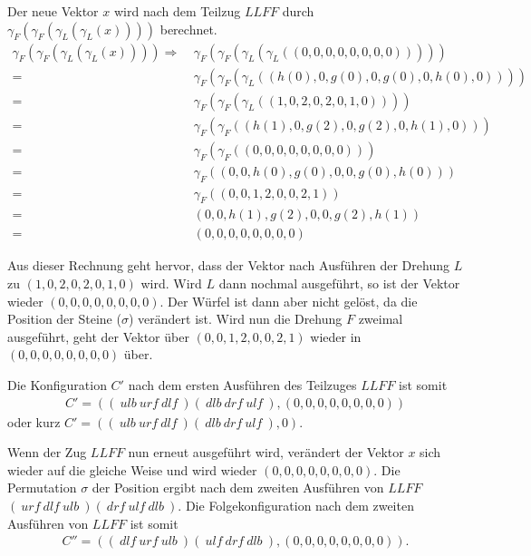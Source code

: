 \documentclass[12pt,a4paper, usenames, dvipsnames]{article}
\theoremstyle{mystyle}
\theoremstyle{definition}
\begin{document}
Der neue Vektor $x$ wird nach dem Teilzug $LLFF$ durch $\gamma_F(\gamma_F(\gamma_L(\gamma_L(x))))$ berechnet. 
\begin{align*}
 \gamma_F(\gamma_F(\gamma_L(\gamma_L(x)))) \Rightarrow \ & \gamma_F(\gamma_F(\gamma_L(\gamma_L((0,0,0,0,0,0,0,0))))) \\
= \ & \gamma_F(\gamma_F(\gamma_L((h(0),0,g(0),0,g(0),0,h(0),0)))) \\
= \ & \gamma_F(\gamma_F(\gamma_L((1,0,2,0,2,0,1,0)))) \\
= \ & \gamma_F(\gamma_F((h(1),0,g(2),0,g(2),0,h(1),0))) \\
= \ & \gamma_F(\gamma_F((0,0,0,0,0,0,0,0))) \\
= \ & \gamma_F((0,0,h(0),g(0),0,0,g(0),h(0))) \\
= \ & \gamma_F((0,0,1,2,0,0,2,1)) \\
= \ & (0,0,h(1),g(2),0,0,g(2),h(1)) \\
= \ & (0,0,0,0,0,0,0,0)
\end{align*}

Aus dieser Rechnung geht hervor, dass der Vektor nach Ausführen der Drehung $L$ zu $(1,0,2,0,2,0,1,0)$ wird. Wird $L$ dann nochmal ausgeführt, so ist der Vektor wieder $(0,0,0,0,0,0,0,0)$. Der Würfel ist dann aber nicht gelöst, da die Position der Steine ($\sigma$) verändert ist.
Wird nun die Drehung $F$ zweimal ausgeführt, geht der Vektor über $(0,0,1,2,0,0,2,1)$ wieder in  $(0,0,0,0,0,0,0,0)$ über. 

Die Konfiguration $C'$ nach dem ersten Ausführen des Teilzuges $LLFF$ ist somit 
\begin{align*}
C' = ((\ \textit{ulb} \ \textit{urf} \ \textit{dlf} \ )(\ \textit{dlb} \ \textit{drf} \ \textit{ulf} \ ),(0,0,0,0,0,0,0,0))
\end{align*} 
oder kurz $C' = ((\ \textit{ulb} \ \textit{urf} \ \textit{dlf} \ )(\ \textit{dlb} \ \textit{drf} \ \textit{ulf} \ ),0)$.

Wenn der Zug $LLFF$ nun erneut ausgeführt wird, verändert der Vektor $x$ sich wieder auf die gleiche Weise und wird wieder $(0,0,0,0,0,0,0,0)$. Die Permutation $\sigma$ der Position ergibt nach dem zweiten Ausführen von $LLFF$ $(\ \textit{urf} \ \textit{dlf} \ \textit{ulb} \ )(\ \textit{drf} \ \textit{ulf} \ \textit{dlb} \ )$. Die Folgekonfiguration nach dem zweiten Ausführen von $LLFF$ ist somit 
\begin{align*}
C'' = ((\ \textit{dlf} \ \textit{urf} \ \textit{ulb} \ )(\ \textit{ulf} \ \textit{drf} \ \textit{dlb} \ ),(0,0,0,0,0,0,0,0)).
\end{align*} 
\end{document}
